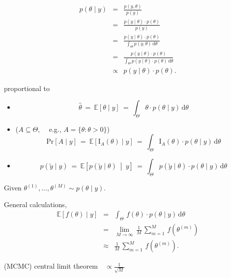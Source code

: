 \documentclass[10pt]{report}
\begin{document}
{\footnotesize
\begin{eqnarray*}
p(\theta \mid y) & = & \frac{p(y, \theta)}{p(y)}
\\[4pt]
& = & \frac{p(y \mid \theta) \cdot p(\theta)}{p(y)}
\\[4pt]
& = & \frac{p(y \mid \theta) \cdot p(\theta)}{\int_{\Theta} p(y, \theta) \, \textrm{d}\theta}
\\[4pt]
& = & \frac{p(y \mid \theta) \cdot p(\theta)}{\int_{\Theta} p(y \mid \theta) \cdot p(\theta) \, \textrm{d}\theta}
\\[10pt]
& \propto &
p(y \mid \theta) \cdot p(\theta).
\end{eqnarray*}
\begin{subitemize}
\item {} proportional to 
\end{subitemize}
}

\begin{itemize}
\item {}
$$
\hat{\theta}
\ = \ \mathbb{E}\!\left[\theta \mid y\right]
\ = \
\int_{\Theta} \theta \cdot p(\theta \mid y) \, \textrm{d}\theta
$$
\item {} ($A \subseteq \Theta$, \ \ {\footnotesize e.g., $A = \{ \theta : \theta > 0\}$})
$$
\textrm{Pr}[A \mid y]
\ = \ \mathbb{E}\!\left[\textrm{I}_A(\theta) \mid y\right]
\ = \
\int_{\Theta} \textrm{I}_A(\theta) \cdot p(\theta \mid y)
\, \textrm{d}\theta
$$
\item {}
$$
p(\tilde{y} \mid y)
\ = \ \mathbb{E}\!\left[p(\tilde{y} \mid \theta) \ \middle| \ y\right]
\ = \
\int_{\Theta} p(\tilde{y} \mid \theta) \cdot p(\theta \mid y)
\, \textrm{d} \theta
$$
\end{itemize}

\begin{subitemize}
\item Given  $\theta^{(1)}, \ldots, \theta^{(M)} \sim p(\theta \mid y).$
\item General  calculations,
\begin{eqnarray*}
\mathbb{E}[f(\theta) \mid y]
& = &
\int_{\Theta} \, f(\theta) \cdot p(\theta \mid y) \, \textrm{d}\theta
\\[8pt]
& = &
\lim_{M \rightarrow \infty} \,
\frac{1}{M} \, \sum_{m=1}^M \, f\!\left(\theta^{(m)}\right)
\\[8pt]
& \approx &
\frac{1}{M} \, \sum_{m=1}^M \, f\!\left(\theta^{(m)}\right).
\end{eqnarray*}
\item (MCMC) central limit theorem  $\mbox{ } \propto \frac{\displaystyle 1}{\displaystyle \sqrt{M}}$
\end{subitemize}
\end{document}

